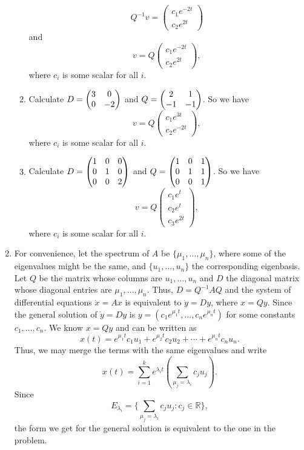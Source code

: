 \begin{enumerate}
\begin{enumerate}
\[Q^{-1}v=\begin{pmatrix}c_1e^{-2t}\\c_2e^{2t}\end{pmatrix}\]
and
\[v=Q\begin{pmatrix}c_1e^{-2t}\\c_2e^{2t}\end{pmatrix},\]
where $c_i$ is some scalar for all $i$.
\item Calculate $D=\begin{pmatrix}3 & 0\cr 0 & -2\end{pmatrix}$ and $Q=\begin{pmatrix}2 & 1\cr -1 & -1\end{pmatrix}$. So we have 
\[v=Q\begin{pmatrix}c_1e^{3t}\\c_2e^{-2t}\end{pmatrix},\]
where $c_i$ is some scalar for all $i$.
\item Calculate $D=\begin{pmatrix}1 & 0 & 0\cr 0 & 1 & 0\cr 0 & 0 & 2\end{pmatrix}$ and $Q=\begin{pmatrix}1 & 0 & 1\cr 0 & 1 & 1\cr 0 & 0 & 1\end{pmatrix}$. So we have 
\[v=Q\begin{pmatrix}c_1e^{t}\\c_2e^{t}\\c_3e^{2t}\end{pmatrix},\]
where $c_i$ is some scalar for all $i$.
\end{enumerate}
\item For convenience, let the spectrum of $A$ be $\{\mu_1,\ldots, \mu_n\}$, where some of the eigenvalues might be the same, and $\{u_1, \ldots, u_n\}$ the corresponding eigenbasis.  Let $Q$ be the matrix whose columns are $u_1,\ldots, u_n$ and $D$ the diagonal matrix whose diagonal entries are $\mu_1, \ldots, \mu_n$.  Thus, $D = Q^{-1}AQ$ and the system of differential equations $\dot{x} = A x$ is equivalent to $\dot{y} = D y$, where $x = Qy$.  Since the general solution of $\dot{y} = D y$ is $y = (c_1e^{\mu_1t}, \ldots, c_ne^{\mu_nt})$ for some constants $c_1, \ldots, c_n$.  We know $x = Qy$ and can be written as  
\[
    x(t) = e^{\mu_1t}c_1u_1 + e^{\mu_2t}c_2u_2 + \cdots + e^{\mu_nt}c_nu_n.
\]
Thus, we may merge the terms with the same eigenvalues and write
\[
    x(t) = \sum_{i=1}^k e^{\lambda_it}\left(\sum_{\mu_j = \lambda_i} c_ju_j\right).
\]
Since 
\[
    E_{\lambda_i} = \{\sum_{\mu_j = \lambda_i} c_ju_j : c_j\in\mathbb{R} \},
\]
the form we get for the general solution is equivalent to the one in the problem.  


\end{enumerate}
